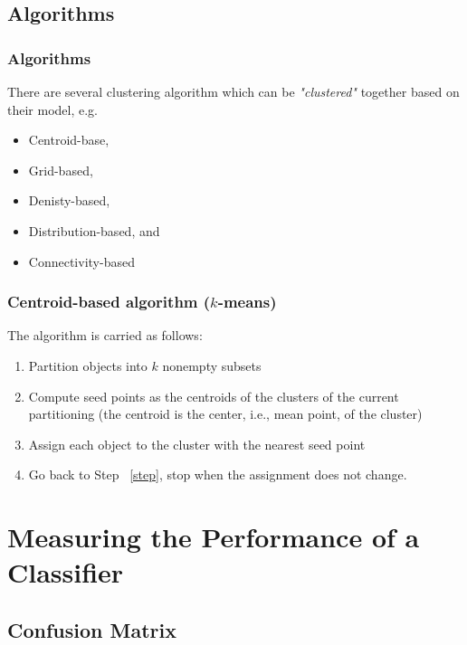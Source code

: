 \documentclass{beamer}
\begin{document}
\subsection{Algorithms}

\begin{frame}
    \frametitle{Algorithms}

There are several clustering algorithm which can be \textit{"clustered"} together based on their model, e.g.

\begin{itemize}
    \item Centroid-base,
    \item Grid-based,
    \item Denisty-based,
    \item Distribution-based, and
    \item Connectivity-based
\end{itemize}
    

\end{frame}



\begin{frame}[allowframebreaks]
    \frametitle{Centroid-based algorithm ($k$-means)}

The algorithm is carried as follows:

    \begin{enumerate}
        \item Partition objects into $k$ nonempty subsets
        \item \label{step}Compute seed points as the centroids of the clusters of the current partitioning (the centroid is the center, i.e., mean point, of the cluster)
        \item Assign each object to the cluster with the nearest seed point
        \item Go back to Step ~\ref{step}, stop when the assignment does not change.
    \end{enumerate}



\end{frame}


\section{Measuring the Performance of a Classifier}






\subsection{Confusion Matrix}
\end{document}
